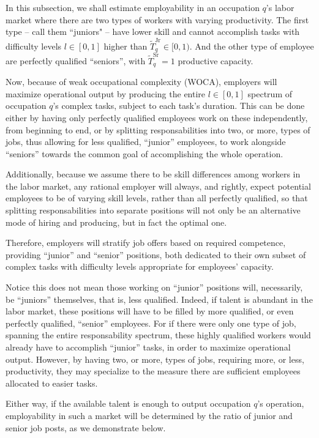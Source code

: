 \documentclass[hidelinks, nonatbib]{elsarticle}
\begin{document}
In this subsection, we shall estimate employability in an occupation $q$'s labor market where there are two types of workers with varying productivity. The first type -- call them ``juniors" -- have lower skill and cannot accomplish tasks with difficulty levels $l \in [0,1]$ higher than $\tilde{T}_{q}^{\text{Jr}} \in [0,1)$. And the other type of employee are perfectly qualified ``seniors'', with $\tilde{T}_{q}^{\text{Sr}} = 1$ productive capacity.

Now, because of weak occupational complexity (WOCA), employers will maximize operational output by producing the entire $l \in [0,1]$ spectrum of occupation $q$'s complex tasks, subject to each task's duration. This can be done either by having only perfectly qualified employees work on these independently, from beginning to end, or by splitting responsabilities into two, or more, types of jobs, thus allowing for less qualified, ``junior'' employees, to work alongside ``seniors'' towards the common goal of accomplishing the whole operation.

Additionally, because we assume there to be skill differences among workers in the labor market, any rational employer will always, and rightly, expect potential employees to be of varying skill levels, rather than all perfectly qualified, so that splitting responsabilities into separate positions will not only be an alternative mode of hiring and producing, but in fact the optimal one.

Therefore, employers will stratify job offers based on required competence, providing ``junior'' and ``senior'' positions, both dedicated to their own subset of complex tasks with difficulty levels appropriate for employees' capacity.

Notice this does not mean those working on ``junior'' positions will, necessarily, be ``juniors'' themselves, that is, less qualified. Indeed, if talent is abundant in the labor market, these positions will have to be filled by more qualified, or even perfectly qualified, ``senior'' employees. For if there were only one type of job, spanning the entire responsability spectrum, these highly qualified workers would already have to accomplish ``junior'' tasks, in order to maximize operational output. However, by having two, or more, types of jobs, requiring more, or less, productivity, they may specialize to the measure there are sufficient employees allocated to easier tasks.

Either way, if the available talent is enough to output occupation $q$'s operation, employability in such a market will be determined by the ratio of junior and senior job posts, as we demonstrate below.
\end{document}
